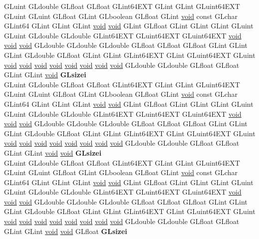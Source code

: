 \begin{DoxyCompactItemize}
\begin{tabbing}
\>GLuint GLdouble GLfloat GLfloat GLint64EXT GLint GLint GLuint64EXT GLuint GLuint GLfloat GLint GLboolean GLfloat GLint \hyperlink{interfacevoid}{void} const GLchar GLint64 GLint GLint GLint \hyperlink{interfacevoid}{void} \hyperlink{interfacevoid}{void} GLint GLfloat GLint GLint GLint GLuint GLuint GLdouble GLdouble GLint64EXT GLuint64EXT GLuint64EXT \hyperlink{interfacevoid}{void} \hyperlink{interfacevoid}{void} \hyperlink{interfacevoid}{void} GLdouble GLdouble GLdouble GLfloat GLfloat GLfloat GLint GLint GLint GLdouble GLfloat GLint GLint GLint64EXT GLint GLuint64EXT GLuint \hyperlink{interfacevoid}{void} \hyperlink{interfacevoid}{void} \hyperlink{interfacevoid}{void} \hyperlink{interfacevoid}{void} \hyperlink{interfacevoid}{void} \hyperlink{interfacevoid}{void} \hyperlink{interfacevoid}{void} \hyperlink{interfacevoid}{void} GLdouble GLdouble GLfloat GLfloat GLint GLint \hyperlink{interfacevoid}{void} {\bfseries GLsizei}\\
\>GLuint GLdouble GLfloat GLfloat GLint64EXT GLint GLint GLuint64EXT GLuint GLuint GLfloat GLint GLboolean GLfloat GLint \hyperlink{interfacevoid}{void} const GLchar GLint64 GLint GLint GLint \hyperlink{interfacevoid}{void} \hyperlink{interfacevoid}{void} GLint GLfloat GLint GLint GLint GLuint GLuint GLdouble GLdouble GLint64EXT GLuint64EXT GLuint64EXT \hyperlink{interfacevoid}{void} \hyperlink{interfacevoid}{void} \hyperlink{interfacevoid}{void} GLdouble GLdouble GLdouble GLfloat GLfloat GLfloat GLint GLint GLint GLdouble GLfloat GLint GLint GLint64EXT GLint GLuint64EXT GLuint \hyperlink{interfacevoid}{void} \hyperlink{interfacevoid}{void} \hyperlink{interfacevoid}{void} \hyperlink{interfacevoid}{void} \hyperlink{interfacevoid}{void} \hyperlink{interfacevoid}{void} \hyperlink{interfacevoid}{void} \hyperlink{interfacevoid}{void} GLdouble GLdouble GLfloat GLfloat GLint GLint \hyperlink{interfacevoid}{void} \hyperlink{interfacevoid}{void} {\bfseries GLsizei}\\
\>GLuint GLdouble GLfloat GLfloat GLint64EXT GLint GLint GLuint64EXT GLuint GLuint GLfloat GLint GLboolean GLfloat GLint \hyperlink{interfacevoid}{void} const GLchar GLint64 GLint GLint GLint \hyperlink{interfacevoid}{void} \hyperlink{interfacevoid}{void} GLint GLfloat GLint GLint GLint GLuint GLuint GLdouble GLdouble GLint64EXT GLuint64EXT GLuint64EXT \hyperlink{interfacevoid}{void} \hyperlink{interfacevoid}{void} \hyperlink{interfacevoid}{void} GLdouble GLdouble GLdouble GLfloat GLfloat GLfloat GLint GLint GLint GLdouble GLfloat GLint GLint GLint64EXT GLint GLuint64EXT GLuint \hyperlink{interfacevoid}{void} \hyperlink{interfacevoid}{void} \hyperlink{interfacevoid}{void} \hyperlink{interfacevoid}{void} \hyperlink{interfacevoid}{void} \hyperlink{interfacevoid}{void} \hyperlink{interfacevoid}{void} \hyperlink{interfacevoid}{void} GLdouble GLdouble GLfloat GLfloat GLint GLint \hyperlink{interfacevoid}{void} \hyperlink{interfacevoid}{void} GLfloat {\bfseries GLsizei}\\

\end{tabbing}
\end{DoxyCompactItemize}
